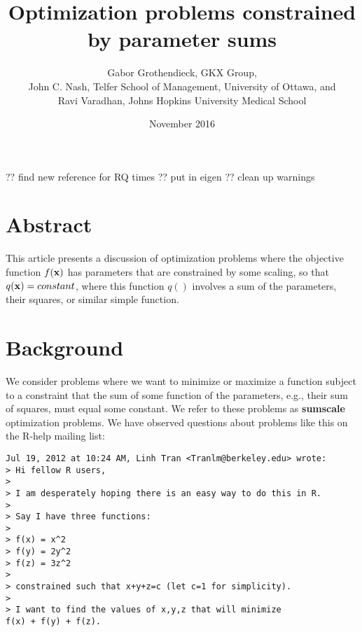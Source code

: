 \documentclass[11pt]{article}\usepackage[]{graphicx}\usepackage[]{color}
\makeatletter
\newenvironment{kframe}{%
 \def\at@end@of@kframe{}%
 \ifinner\ifhmode%
  \def\at@end@of@kframe{\end{minipage}}%
  \begin{minipage}{\columnwidth}%
 \fi\fi%
 \def\FrameCommand##1{\hskip\@totalleftmargin \hskip-\fboxsep
 \colorbox{shadecolor}{##1}\hskip-\fboxsep
     \hskip-\linewidth \hskip-\@totalleftmargin \hskip\columnwidth}%
 \MakeFramed {\advance\hsize-\width
   \@totalleftmargin\z@ \linewidth\hsize
   \@setminipage}}%
 {\par\unskip\endMakeFramed%
 \at@end@of@kframe}
\newenvironment{knitrout}{}{} %
\newcommand{\B}[1]{{\bf #1 \rm}}
\makeatother
\begin{document}




?? find new reference for RQ times
?? put in eigen
?? clean up warnings


\begin{knitrout}
\color{fgcolor}\begin{kframe}


{\ttfamily\noindent\color{warningcolor}{\#\# Warning in dep\_auto(): corrupt dependency files? \\\#\# try remove cache/\_\_objects; cache/\_\_globals}}\end{kframe}
\end{knitrout}


\title{Optimization problems constrained by parameter sums}
\author{Gabor Grothendieck, GKX Group,\\
John C. Nash, Telfer School of Management, University of Ottawa, and\\
Ravi Varadhan, Johns Hopkins University Medical School}
\date{November 2016}
\maketitle

\section*{Abstract}

This article presents a discussion of optimization problems where the 
objective function $f(\B{x})$ has parameters that are constrained by some
scaling, so that $q(\B{x}) = constant$, where this function $q()$ involves
a sum of the parameters, their squares, or similar simple function.

\section{Background}

We consider problems where we want to minimize or maximize a function subject to a constraint
that the sum of some function of the parameters, e.g., their sum of squares, must 
equal some constant.
We refer to these problems as \B{sumscale} optimization problems. We have observed questions 
about problems like this on the R-help mailing list: 

\begin{verbatim}
Jul 19, 2012 at 10:24 AM, Linh Tran <Tranlm@berkeley.edu> wrote:
> Hi fellow R users,
>
> I am desperately hoping there is an easy way to do this in R.
>
> Say I have three functions:
>
> f(x) = x^2
> f(y) = 2y^2
> f(z) = 3z^2
>
> constrained such that x+y+z=c (let c=1 for simplicity).
>
> I want to find the values of x,y,z that will minimize 
f(x) + f(y) + f(z).
\end{verbatim}
\end{document}

